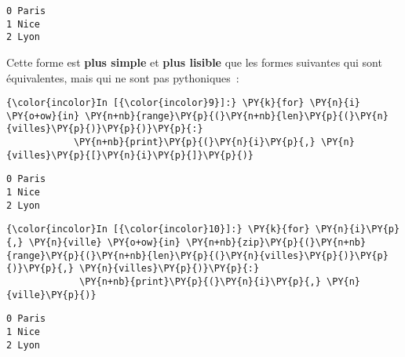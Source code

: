     \begin{Verbatim}[commandchars=\\\{\},frame=single,framerule=0.3mm,rulecolor=\color{cellframecolor}]
0 Paris
1 Nice
2 Lyon
\end{Verbatim}

    Cette forme est \textbf{plus simple} et \textbf{plus lisible} que les
formes suivantes qui sont équivalentes, mais qui ne sont pas
pythoniques~:

    \begin{Verbatim}[commandchars=\\\{\},frame=single,framerule=0.3mm,rulecolor=\color{cellframecolor}]
{\color{incolor}In [{\color{incolor}9}]:} \PY{k}{for} \PY{n}{i} \PY{o+ow}{in} \PY{n+nb}{range}\PY{p}{(}\PY{n+nb}{len}\PY{p}{(}\PY{n}{villes}\PY{p}{)}\PY{p}{)}\PY{p}{:}
            \PY{n+nb}{print}\PY{p}{(}\PY{n}{i}\PY{p}{,} \PY{n}{villes}\PY{p}{[}\PY{n}{i}\PY{p}{]}\PY{p}{)}
\end{Verbatim}


    \begin{Verbatim}[commandchars=\\\{\},frame=single,framerule=0.3mm,rulecolor=\color{cellframecolor}]
0 Paris
1 Nice
2 Lyon
\end{Verbatim}

    \begin{Verbatim}[commandchars=\\\{\},frame=single,framerule=0.3mm,rulecolor=\color{cellframecolor}]
{\color{incolor}In [{\color{incolor}10}]:} \PY{k}{for} \PY{n}{i}\PY{p}{,} \PY{n}{ville} \PY{o+ow}{in} \PY{n+nb}{zip}\PY{p}{(}\PY{n+nb}{range}\PY{p}{(}\PY{n+nb}{len}\PY{p}{(}\PY{n}{villes}\PY{p}{)}\PY{p}{)}\PY{p}{,} \PY{n}{villes}\PY{p}{)}\PY{p}{:}
             \PY{n+nb}{print}\PY{p}{(}\PY{n}{i}\PY{p}{,} \PY{n}{ville}\PY{p}{)}
\end{Verbatim}


    \begin{Verbatim}[commandchars=\\\{\},frame=single,framerule=0.3mm,rulecolor=\color{cellframecolor}]
0 Paris
1 Nice
2 Lyon
\end{Verbatim}


    
    
    
